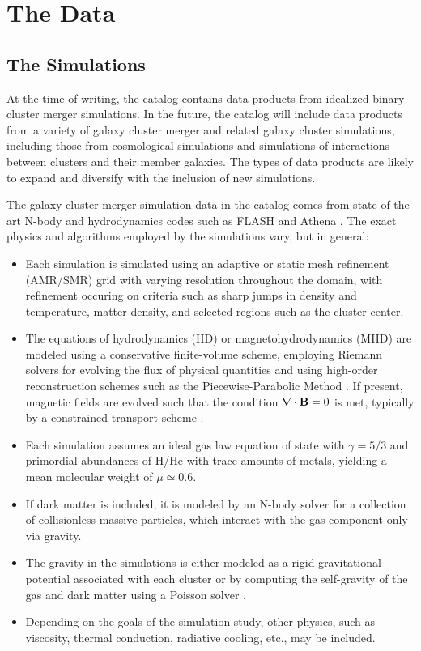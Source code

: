 \documentclass{emulateapj}
\begin{document}
\section{The Data}

\subsection{The Simulations}

At the time of writing, the catalog contains data products from idealized binary cluster merger
simulations. In the future, the catalog will include data products from a variety of galaxy cluster merger and related galaxy cluster simulations, including those from cosmological simulations and simulations of interactions between clusters and their member galaxies. The types of data products are likely to expand and diversify with the inclusion of new simulations.

The galaxy cluster merger simulation data in the catalog comes from state-of-the-art N-body and hydrodynamics codes such as FLASH \citep{dub09} and Athena \citep{sto08}. The exact physics and algorithms employed by the simulations vary, but in general:

\begin{itemize}
\item Each simulation is simulated using an adaptive or static mesh refinement (AMR/SMR) grid \citep{ber89} with varying resolution throughout the domain, with refinement occuring on criteria such as sharp jumps in density and temperature, matter density, and selected regions such as the cluster center.
\item The equations of hydrodynamics (HD) or magnetohydrodynamics (MHD) are modeled using a conservative finite-volume scheme, employing Riemann solvers for evolving the flux of physical quantities and using high-order reconstruction schemes such as the Piecewise-Parabolic Method \citep[PPM,][]{col84}. If present, magnetic fields are evolved such that the condition $\nabla \cdot {\bf B} = 0$ is met, typically by a constrained transport scheme \citep[CT,][]{eva88}.
\item Each simulation assumes an ideal gas law equation of state with $\gamma = 5/3$ and primordial abundances of H/He with trace amounts of metals, yielding a mean molecular weight of $\mu \simeq 0.6$.
\item If dark matter is included, it is modeled by an N-body solver for a collection of collisionless massive particles, which interact with the gas component only via gravity.
\item The gravity in the simulations is either modeled as a rigid gravitational potential associated with each cluster or by computing the self-gravity of the gas and dark matter using a Poisson solver \citep[e.g.,][]{ric08}.
\item Depending on the goals of the simulation study, other physics, such as viscosity, thermal conduction, radiative cooling, etc., may be included.
\end{itemize}
\end{document}
